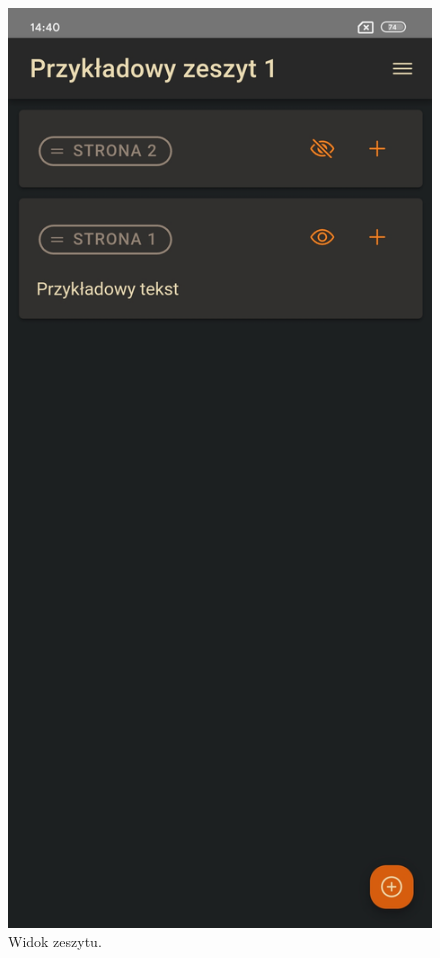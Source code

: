 \begin{figure}[H]
	\begin{center}
		\includegraphics[scale=0.2]{media/BookView.jpg}
	\end{center}
	\caption{Widok zeszytu.}
	\label{rys:book-view}
\end{figure}

